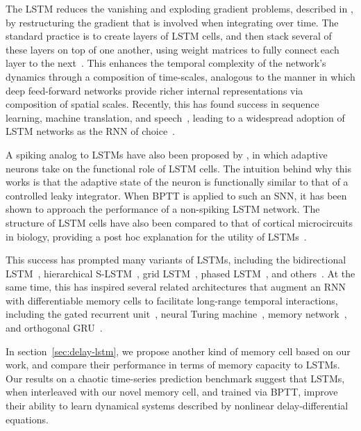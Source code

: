The LSTM reduces the vanishing and exploding gradient problems, described in \citet{bengio1994learning}, by restructuring the gradient that is involved when integrating over time.
The standard practice is to create layers of LSTM cells, and then stack several of these layers on top of one another, using weight matrices to fully connect each layer to the next~\citep{graves2013speech}.
This enhances the temporal complexity of the network's dynamics through a composition of time-scales, analogous to the manner in which deep feed-forward networks provide richer internal representations via composition of spatial scales.
Recently, this has found success in sequence learning, machine translation, and speech~\citep{graves2013speech, sutskever2014sequence, cho2014learning, bahdanau2014neural}, leading to a widespread adoption of LSTM networks as the RNN of choice~\citep{lecun2015deep}.

A spiking analog to LSTMs have also been proposed by \citet{bellec2018long}, in which adaptive neurons take on the functional role of LSTM cells.
The intuition behind why this works is that the adaptive state of the neuron is functionally similar to that of a controlled leaky integrator.
When BPTT is applied to such an SNN, it has been shown to approach the performance of a non-spiking LSTM network.
The structure of LSTM cells have also been compared to that of cortical microcircuits in biology, providing a post hoc explanation for the utility of LSTMs~\citep{costa2017cortical}.

This success has prompted many variants of LSTMs, including the bidirectional LSTM~\citep{graves2005framewise}, hierarchical S-LSTM~\citep{zhu2015long}, grid LSTM~\citep{kalchbrenner2015grid}, phased LSTM~\citep{neil2016phased}, and others~\citep{salehinejad2017recent}.
At the same time, this has inspired several related architectures that augment an RNN with differentiable memory cells to facilitate long-range temporal interactions, including the gated recurrent unit~\citep[GRU;][]{cho2014properties, chung2014empirical}, neural Turing machine~\citep{graves2014neural}, memory network~\citep{weston2014memory}, and orthogonal GRU~\citep{jing2018gated}.

In section~\ref{sec:delay-lstm}, we propose another kind of memory cell based on our work, and compare their performance in terms of memory capacity to LSTMs.
Our results on a chaotic time-series prediction benchmark suggest that LSTMs, when interleaved with our novel memory cell, and trained via BPTT, improve their ability to learn dynamical systems described by nonlinear delay-differential equations.

